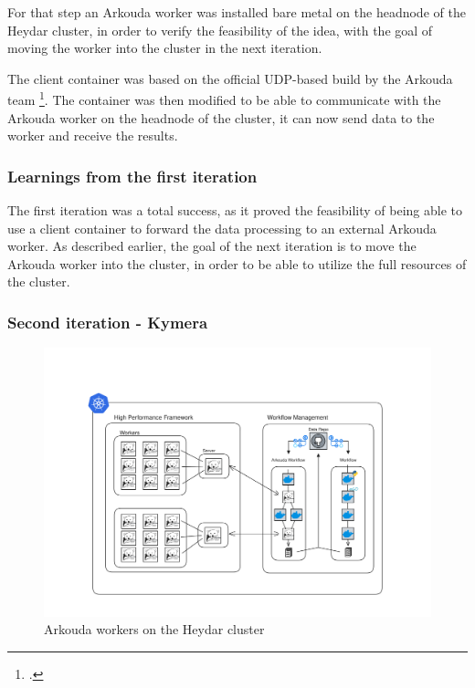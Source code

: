 For that step an Arkouda worker was installed bare metal on the headnode of the Heydar cluster, in order to verify the feasibility of the idea,
with the goal of moving the worker into the cluster in the next iteration.

The client container was based on the official \ac{UDP}-based build by the Arkouda team \footcite{ArkoudacontribArkoudadockerMain}.
The container was then modified to be able to communicate with the Arkouda worker on the headnode of the cluster, it can now send data to the worker and receive the results.

\subsubsection*{Learnings from the first iteration}

The first iteration was a total success, as it proved the feasibility of being able to use a client container to forward the data processing to an external Arkouda worker.
As described earlier, the goal of the next iteration is to move the Arkouda worker into the cluster, in order to be able to utilize the full resources of the cluster.

\subsubsection{Second iteration - Kymera}

\begin{figure}[htb]
    \centering
    \includegraphics[width=16cm]{graphics/PachyKouda.png}
    \caption[Arkouda workers on \ac{k8s}]{Arkouda workers on the Heydar cluster}
    \label{abb:arkouda_workers_on_k8s}
\end{figure}

